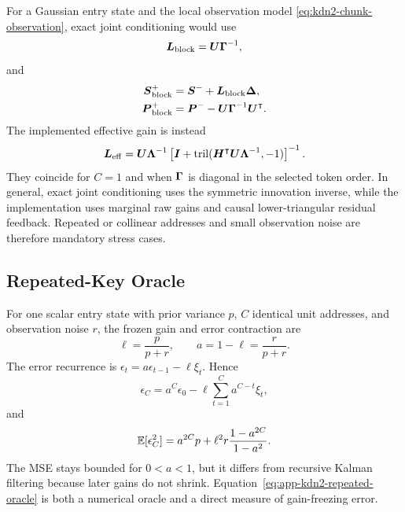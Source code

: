 \documentclass[11pt,letterpaper,logo]{yalearxiv}
\newcommand{\tril}{\operatorname{tril}}
\begin{document}
For a Gaussian entry state and the local observation model
\eqref{eq:kdn2-chunk-observation}, exact joint conditioning would use
\begin{equation}
  \boldsymbol{L}_{\mathrm{block}}
  =
  \boldsymbol{U}\boldsymbol{\Gamma}^{-1},
  \label{eq:app-kdn2-exact-block-gain}
\end{equation}
and
\begin{equation}
\begin{aligned}
  \boldsymbol{S}_{\mathrm{block}}^+
  &=
  \boldsymbol{S}^-+\boldsymbol{L}_{\mathrm{block}}\boldsymbol{\Delta},
  \\
  \boldsymbol{P}_{\mathrm{block}}^+
  &=
  \boldsymbol{P}^--\boldsymbol{U}\boldsymbol{\Gamma}^{-1}\boldsymbol{U}^{\intercal}.
\end{aligned}
\label{eq:app-kdn2-exact-block-posterior}
\end{equation}
The implemented effective gain is instead
\begin{equation}
  \ve{L}_{\mathrm{eff}}
  =
  \ve{U}\ve{\Lambda}^{-1}
  \left[
    \ve{I}
    +
    \tril(
      \ve{H}^{\tr}\ve{U}\ve{\Lambda}^{-1},
      -1
    )
  \right]^{-1}.
  \label{eq:app-kdn2-effective-expanded}
\end{equation}
They coincide for $C=1$ and when $\boldsymbol{\Gamma}$ is diagonal in the selected token order. In
general, exact joint conditioning uses the symmetric innovation inverse, while the implementation
uses marginal raw gains and causal lower-triangular residual feedback. Repeated or collinear
addresses and small observation noise are therefore mandatory stress cases.

\subsection{Repeated-Key Oracle}

For one scalar entry state with prior variance $p$, $C$ identical unit addresses, and observation
noise $r$, the frozen gain and error contraction are
\begin{equation}
  \ell=\frac{p}{p+r},
  \qquad
  a=1-\ell=\frac{r}{p+r}.
  \label{eq:app-kdn2-repeated-parameters}
\end{equation}
The error recurrence is
$\epsilon_t=a\epsilon_{t-1}-\ell\xi_t$. Hence
\begin{equation}
  \epsilon_C
  =
  a^C\epsilon_0
  -
  \ell\sum_{t=1}^{C}a^{C-t}\xi_t,
\end{equation}
and
\begin{equation}
  \mathbb{E}[\epsilon_C^2]
  =
  a^{2C}p
  +
  \ell^2r
  \frac{1-a^{2C}}{1-a^2}.
  \label{eq:app-kdn2-repeated-oracle}
\end{equation}
The MSE stays bounded for $0<a<1$, but it differs from recursive Kalman filtering because later
gains do not shrink. Equation~\eqref{eq:app-kdn2-repeated-oracle} is both a numerical oracle and a
direct measure of gain-freezing error.
\end{document}
